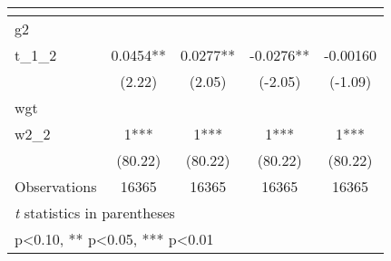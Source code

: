 \begin{table}[htbp]\centering
\def\sym#1{\ifmmode^{#1}\else\(^{#1}\)\fi}
\caption{ \label{tab1}}
\begin{tabular}{l*{4}{c}}
\toprule
                    &\multicolumn{1}{c}{}&\multicolumn{1}{c}{}&\multicolumn{1}{c}{}&\multicolumn{1}{c}{}\\
\midrule
g2                  &               &               &               &               \\
t\_1\_2               &      0.0454** &      0.0277** &     -0.0276** &    -0.00160   \\
                    &      (2.22)   &      (2.05)   &     (-2.05)   &     (-1.09)   \\
\midrule
wgt                 &               &               &               &               \\
w2\_2                &           1***&           1***&           1***&           1***\\
                    &     (80.22)   &     (80.22)   &     (80.22)   &     (80.22)   \\
\midrule
Observations        &       16365   &       16365   &       16365   &       16365   \\
\bottomrule
\multicolumn{5}{l}{\footnotesize \textit{t} statistics in parentheses}\\
\multicolumn{5}{l}{\footnotesize * p<0.10, ** p<0.05, *** p<0.01}\\
\end{tabular}
\end{table}
